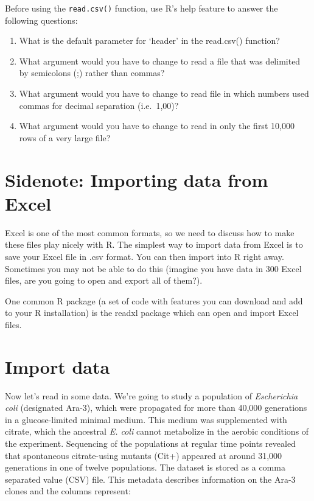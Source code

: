 \documentclass[]{book}
\providecommand{\tightlist}{%
  \setlength{\itemsep}{0pt}\setlength{\parskip}{0pt}}
\begin{document}
Before using the \texttt{read.csv()} function, use R's help feature to answer the following questions:

\begin{enumerate}
\def\labelenumi{\arabic{enumi}.}
\tightlist
\item
  What is the default parameter for `header' in the read.csv() function?
\item
  What argument would you have to change to read a file that was delimited by semicolons (;) rather than commas?
\item
  What argument would you have to change to read file in which numbers used commas for decimal separation (i.e.~1,00)?
\item
  What argument would you have to change to read in only the first 10,000 rows of a very large file?
\end{enumerate}

\hypertarget{sidenote-importing-data-from-excel}{%
\section{Sidenote: Importing data from Excel}\label{sidenote-importing-data-from-excel}}

Excel is one of the most common formats, so we need to discuss how to make these files play nicely with R. The simplest way to import data from Excel is to save your Excel file in .csv format. You can then import into R right away. Sometimes you may not be able to do this (imagine you have data in 300 Excel files, are you going to open and export all of them?).

One common R package (a set of code with features you can download and add to your R installation) is the readxl package which can open and import Excel files.

\hypertarget{import-data}{%
\section{Import data}\label{import-data}}

Now let's read in some data. We're going to study a population of \emph{Escherichia coli} (designated Ara-3), which were propagated for more than 40,000 generations in a glucose-limited minimal medium. This medium was supplemented with citrate, which the ancestral \emph{E. coli} cannot metabolize in the aerobic conditions of the experiment. Sequencing of the populations at regular time points revealed that spontaneous citrate-using mutants (Cit+) appeared at around 31,000 generations in one of twelve populations. The dataset is stored as a comma separated value (CSV) file. This metadata describes information on the Ara-3 clones and the columns represent:
\end{document}
